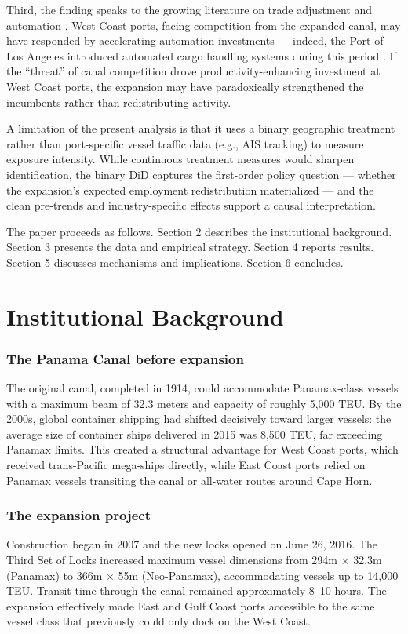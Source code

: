 \documentclass[12pt]{article}
\begin{document}
Third, the finding speaks to the growing literature on trade adjustment and automation \citep{autorlabor2013, acemoglu2020}. West Coast ports, facing competition from the expanded canal, may have responded by accelerating automation investments --- indeed, the Port of Los Angeles introduced automated cargo handling systems during this period \citep{mongelluzzo2018}. If the ``threat'' of canal competition drove productivity-enhancing investment at West Coast ports, the expansion may have paradoxically strengthened the incumbents rather than redistributing activity.

A limitation of the present analysis is that it uses a binary geographic treatment rather than port-specific vessel traffic data (e.g., AIS tracking) to measure exposure intensity. While continuous treatment measures would sharpen identification, the binary DiD captures the first-order policy question --- whether the expansion's expected employment redistribution materialized --- and the clean pre-trends and industry-specific effects support a causal interpretation.

The paper proceeds as follows. Section 2 describes the institutional background. Section 3 presents the data and empirical strategy. Section 4 reports results. Section 5 discusses mechanisms and implications. Section 6 concludes.

\section{Institutional Background}

\subsubsection*{The Panama Canal before expansion} The original canal, completed in 1914, could accommodate Panamax-class vessels with a maximum beam of 32.3 meters and capacity of roughly 5,000 TEU. By the 2000s, global container shipping had shifted decisively toward larger vessels: the average size of container ships delivered in 2015 was 8,500 TEU, far exceeding Panamax limits. This created a structural advantage for West Coast ports, which received trans-Pacific mega-ships directly, while East Coast ports relied on Panamax vessels transiting the canal or all-water routes around Cape Horn.

\subsubsection*{The expansion project} Construction began in 2007 and the new locks opened on June 26, 2016. The Third Set of Locks increased maximum vessel dimensions from 294m $\times$ 32.3m (Panamax) to 366m $\times$ 55m (Neo-Panamax), accommodating vessels up to 14,000 TEU. Transit time through the canal remained approximately 8--10 hours. The expansion effectively made East and Gulf Coast ports accessible to the same vessel class that previously could only dock on the West Coast.
\end{document}
